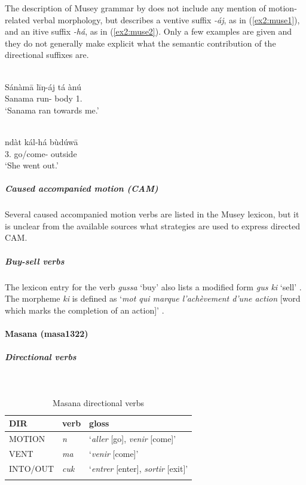 The description of Musey grammar by \citet{platielEsquisseEtudeMusey1968} does not include any mention of motion-related verbal morphology, but \citet{dassidiMorphophonologicalStructureMusej2015} describes a ventive suffix \textit{-áj}, as in (\ref{ex2:muse1}), and an itive suffix \textit{-há}, as in (\ref{ex2:muse2}). Only a few examples are given and they do not generally make explicit what the semantic contribution of the directional suffixes are. 

\ea\label{ex2:muse1}
 \\
\gll Sánàmā līŋ-áj tá ànú	\\
Sanama run- body 1. \\
\glt `Sanama ran towards me.'

\ex\label{ex2:muse2}
 \\
\gll ndàt kál-há bùdúwā	\\
3. go/come- outside		\\
\glt `She went out.'
\z 

\subparagraph{Caused accompanied motion (CAM)}

Several caused accompanied motion verbs are listed in the Musey lexicon, but it is unclear from the available sources what strategies are used to express directed CAM. 

\subparagraph{Buy-sell verbs}

The lexicon entry for the verb \textit{gussa} `buy' also lists a modified form \textit{gus ki} `sell' \citep[13]{shryockMagaaraHadVun1998}. The morpheme \textit{ki} is defined as `\textit{mot qui marque l'achèvement d'une action} [word which marks the completion of an action]' \citep[18]{shryockMagaaraHadVun1998}.

\newpage
\paragraph*{Masana (masa1322)}  \label{masa}

\subparagraph{Directional verbs}~

\begin{table}[H]
	\caption{Masana directional verbs} 
	\label{tab:masaV}
	\begin{tabular}{lll} %
		\lsptoprule
		DIR & verb & gloss   \\ %
		\midrule
		MOTION & \textit{n} & `\textit{aller} [go], \textit{venir} [come]' \\
		VENT & \textit{ma} & `\textit{venir} [come]' \\
		INTO/OUT & \textit{cuk} & `\textit{entrer} [enter], \textit{sortir} [exit]' \\
		\lspbottomrule
	\end{tabular}
\end{table}

